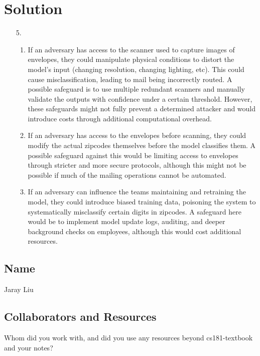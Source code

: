 \documentclass[submit]{../harvardml}
\newenvironment{answer}
  {\section*{Solution}}
{}
\begin{document}
\begin{answer}
\begin{enumerate}
    \item[5.] 

      \begin{enumerate}
        \item  If an adversary has access to the scanner used to capture images of envelopes, they could manipulate physical conditions to distort the model’s input (changing resolution, changing lighting, etc). This could cause misclassification, leading to mail being incorrectly routed. A possible safeguard is to use multiple redundant scanners and manually validate the outputs with confidence under a certain threshold. However, these safeguards might not fully prevent a determined attacker and would introduce costs through additional computational overhead.
        \item If an adversary has access to the envelopes before scanning, they could modify the actual zipcodes themselves before the model classifies them. A possible safeguard against this would be limiting access to envelopes through stricter and more secure protocols, although this might not be possible if much of the mailing operations cannot be automated.
        \item If an adversary can influence the teams maintaining and retraining the model, they could introduce biased training data, poisoning the system to systematically misclassify certain digits in zipcodes. A safeguard here would be to implement model update logs, auditing, and deeper background checks on employees, although this would cost additional resources.
      \end{enumerate}


  \end{enumerate}

\end{answer}


\newpage
\subsection*{Name}
Jaray Liu
\subsection*{Collaborators and Resources}
Whom did you work with, and did you use any resources beyond cs181-textbook and your notes?
\end{document}

